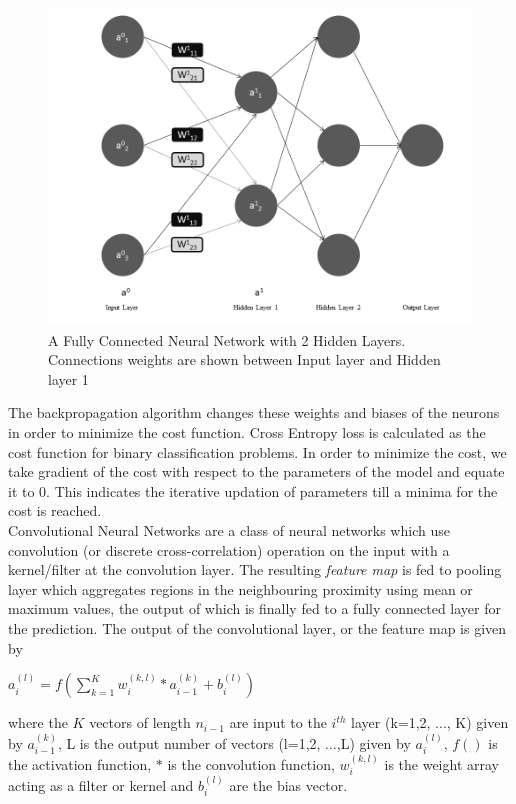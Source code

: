 \begin{figure}[H]
    \centering
    \includegraphics[scale=0.35]{Images/ANN.png}
    \caption{A Fully Connected Neural Network with 2 Hidden Layers. Connections weights are shown between Input layer and Hidden layer 1}
    \label{fig:ANN}
\end{figure}

The backpropagation algorithm changes these weights and biases of the neurons in order to minimize the cost function. Cross Entropy loss is calculated as the cost function for binary classification problems. In order to minimize the cost, we take gradient of the cost with respect to the parameters of the model and equate it to 0. This indicates the iterative updation of parameters till a minima for the cost is reached.\\

Convolutional Neural Networks are a class of neural networks which use convolution (or discrete cross-correlation) operation on the input with a kernel/filter at the convolution layer. The resulting \emph{feature map} is fed to pooling layer which aggregates regions in the neighbouring proximity using mean or maximum values, the output of which is finally fed to a fully connected layer for the prediction. The output of the convolutional layer, or the feature map is given by \\
\begin{center}
    $a_i^{(l)} = f(\sum_{k=1}^K w_i^{(k,l)} * a_{i-1}^{(k)} + b_i^{(l)})$
\end{center}
where the $K$ vectors of length $n_{i-1}$ are input to the $i^{th}$ layer (k=1,2, ..., K) given by $a_{i-1}^{(k)}$, L is the output number of vectors (l=1,2, ...,L) given by $a_i^{(l)}$, $f()$ is the activation function, $*$ is the convolution function, $w_i^{(k,l)}$ is the weight array acting as a filter or kernel and $b_i^{(l)}$ are the bias vector.


